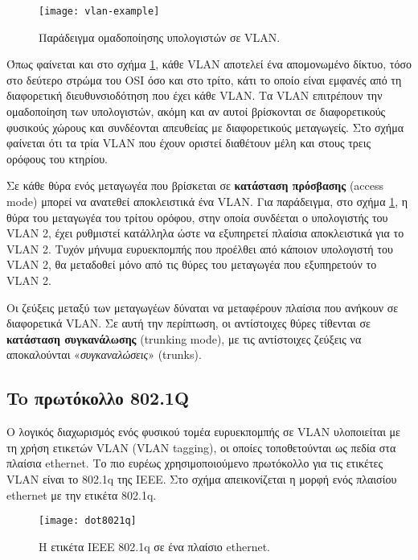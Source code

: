 \documentclass{EdipyLabs} %
\begin{document}
\begin{figure}[ht]
	\centering
	\texttt{[image: vlan-example]}
	\caption{Παράδειγμα ομαδοποίησης υπολογιστών σε VLAN.}\label{fig:grouping}
\end{figure}

Όπως φαίνεται και στο σχήμα \ref{fig:grouping}, κάθε VLAN αποτελεί ένα απομονωμένο δίκτυο, τόσο στο δεύτερο στρώμα του OSI όσο και στο τρίτο, κάτι το οποίο είναι εμφανές από τη διαφορετική διευθυνσιοδότηση που έχει κάθε VLAN. Τα VLAN επιτρέπουν την ομαδοποίηση των υπολογιστών, ακόμη και αν αυτοί βρίσκονται σε διαφορετικούς φυσικούς χώρους και συνδέονται απευθείας με διαφορετικούς μεταγωγείς. Στο σχήμα φαίνεται ότι τα τρία VLAN που έχουν οριστεί διαθέτουν μέλη και στους τρεις ορόφους του κτηρίου.  

Σε κάθε θύρα ενός μεταγωγέα που βρίσκεται σε \textbf{κατάσταση πρόσβασης} (access mode) μπορεί να ανατεθεί αποκλειστικά ένα VLAN. Για παράδειγμα, στο σχήμα \ref{fig:grouping}, η θύρα του μεταγωγέα του τρίτου ορόφου, στην οποία συνδέεται ο υπολογιστής του VLAN 2, έχει ρυθμιστεί κατάλληλα ώστε να εξυπηρετεί πλαίσια αποκλειστικά για το VLAN 2. Τυχόν μήνυμα ευρυεκπομπής που προέλθει από κάποιον υπολογιστή του VLAN 2, θα μεταδοθεί μόνο από τις θύρες του μεταγωγέα που εξυπηρετούν το VLAN 2. 

Οι ζεύξεις μεταξύ των μεταγωγέων δύναται να μεταφέρουν πλαίσια που ανήκουν σε διαφορετικά VLAN. Σε αυτή την περίπτωση, οι αντίστοιχες θύρες τίθενται σε \textbf{κατάσταση συγκανάλωσης} (trunking mode), με τις αντίστοιχες ζεύξεις να αποκαλούνται «\textit{συγκαναλώσεις}» (trunks). 

\subsection{To πρωτόκολλο 802.1Q}
O λογικός διαχωρισμός ενός φυσικού τομέα ευρυεκπομπής σε VLAN υλοποιείται με τη χρήση ετικετών VLAN (VLAN tagging), οι οποίες τοποθετούνται ως πεδία στα πλαίσια ethernet. Το πιο ευρέως χρησιμοποιούμενο πρωτόκολλο για τις ετικέτες VLAN είναι το 802.1q της IEEE. Στο σχήμα απεικονίζεται η μορφή ενός πλαισίου ethernet με την ετικέτα 802.1q.

\begin{figure}[ht]
	\centering
	\texttt{[image: dot8021q]}
	\caption{Η ετικέτα ΙΕΕΕ 802.1q σε ένα πλαίσιο ethernet.}\label{fig:dot8021q}
\end{figure}
\end{document}
